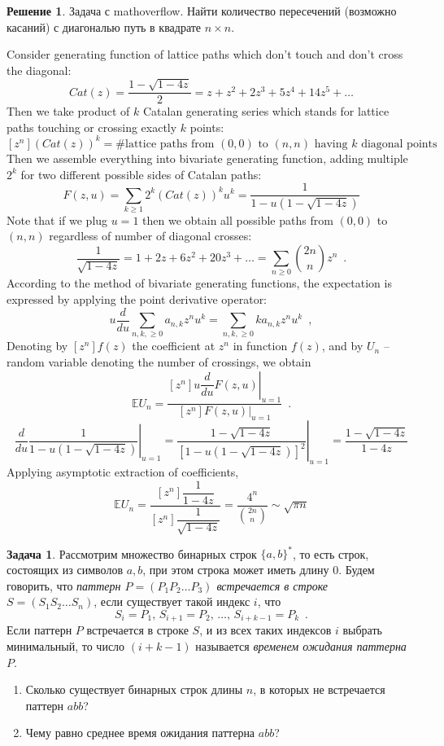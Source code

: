 \documentclass[a5paper]{article}
\theoremstyle{definition}
\newtheorem{problem}{Задача}
\newtheorem*{solution}{Решение}
\begin{document}
\begin{solution}
Задача с mathoverflow. Найти количество пересечений (возможно касаний) с
диагональю путь в квадрате \( n \times n \).               

Consider generating function of lattice paths which don't touch and don't cross the diagonal:
$$
    Cat(z) = \dfrac{1 - \sqrt{1 - 4z}}{2} = z + z^2 + 2z^3 + 5z^4 + 14z^5 + \ldots
$$
Then we take product of $ k $ Catalan generating series which stands for lattice paths touching or crossing exactly $ k$ points:
$$
    [z^n] (Cat(z))^k = \text{\# lattice paths from $(0,0)$ to $(n,n)$ having $k$ diagonal points}
$$
Then we assemble everything into bivariate generating function, adding multiple $2^k$ for two different possible sides of Catalan paths:
$$
    F(z,u) = \sum_{k \geq 1} 2^k(Cat(z))^k u^k = \dfrac{1}{1 - u(1 - \sqrt{1-4z})}
$$
Note that if we plug $u=1$ then we obtain all possible paths from $(0,0)$ to $(n,n)$ regardless of number of diagonal crosses:
$$
    \dfrac{1}{\sqrt{1-4z}} = 1 + 2z + 6z^2 + 20z^3 + \ldots = \sum_{n \geq 0} {2n \choose n} z^n \enspace .
$$
According to the method of bivariate generating functions, the expectation is expressed by applying the point derivative operator:
$$
    u \dfrac{d}{du} \sum_{n, k, \geq 0} a_{n,k} z^n u^k = 
    \sum_{n, k, \geq 0} k a_{n,k} z^n u^k \enspace ,
$$
Denoting by $[z^n]f(z)$ the coefficient at $z^n$ in function $f(z)$, and by $U_n$ – random variable denoting the number of crossings, we obtain
$$
    \mathbb E U_n = \dfrac{[z^n] \left.u \dfrac{d}{du} F(z,u)\right|_{u=1}}{[z^n] \left.F(z,u)\right|_{u=1}} \enspace .
$$
$$
    \left.\dfrac{d}{du}\dfrac{1}{1 - u(1 - \sqrt{1-4z})} \right|_{u=1} = 
    \left.\dfrac{1 - \sqrt{1-4z}}{\left[1 - u(1 - \sqrt{1-4z})\right]^2} \right|_{u=1} =
    \dfrac{1 - \sqrt{1-4z}}{1 - 4z}
$$
Applying asymptotic extraction of coefficients,
$$
    \mathbb E U_n =
    \dfrac{[z^n] \dfrac{1}{1 - 4z}}
    {[z^n] \dfrac{1}{\sqrt{1 - 4z}}} = 
    \dfrac{4^n}{ {2n \choose n} } \sim \sqrt{ \pi n}
$$
\end{solution}
    
\begin{problem} Рассмотрим множество бинарных строк \( \{ a, b \}^\ast \), то
есть строк, состоящих из символов \( a, b \), при этом строка может иметь длину
\( 0 \). Будем говорить, что \emph{паттерн \( P = (P_1 P_2 \ldots P_3) \)
встречается в строке \( S = (S_1 S_2 \ldots S_n) \)}, если существует такой индекс \( i \), что
\begin{equation}
    S_i = P_1, \, 
    S_{i+1} = P_2, \,
    \ldots, \,
    S_{i+k-1} = P_k \enspace .
\end{equation}
Если паттерн \( P \) встречается в строке \( S \), и из всех таких индексов \( i
\) выбрать минимальный, то число \( (i+k-1) \) называется \emph{временем
ожидания паттерна \( P \)}.
\begin{enumerate}
\item Сколько существует бинарных строк длины \( n \), в которых не встречается
паттерн \( abb \)? 
\item Чему равно среднее время ожидания паттерна \( abb \)?
\end{enumerate}
\end{problem}       
\end{document}
